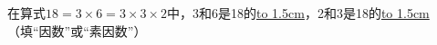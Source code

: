 在算式$18 = 3\times6 = 3\times3\times2$中，3和6是18的\underline{\hbox to 1.5cm{}}，2和3是18的\underline{\hbox to 1.5cm{}}（填“因数”或“素因数”）